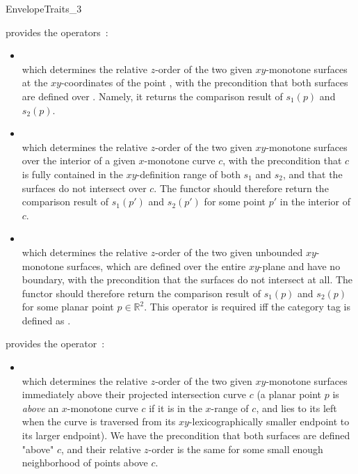 \begin{ccRefConcept}{EnvelopeTraits_3}
{provides the operators~:
 \begin{itemize}
 \item {}\\
 which determines the relative $z$-order of the two given $xy$-monotone
 surfaces at the $xy$-coordinates of the point , with the
 precondition that both surfaces are defined over . Namely, it
 returns the comparison result of $s_1(p)$ and $s_2(p)$.
%
 \item {}\\
 which determines the relative $z$-order of the two given $xy$-monotone
 surfaces over the interior of a given $x$-monotone curve $c$, with the
 precondition that $c$ is fully contained in the $xy$-definition range
 of both $s_1$ and $s_2$, and that the surfaces do not intersect over
 $c$. The functor should therefore return the comparison result of
 $s_1(p')$ and $s_2(p')$ for some point $p'$ in the interior of $c$.
 \item {}\\
 which determines the relative $z$-order of the two given unbounded
 $xy$-monotone surfaces, which are defined over the entire $xy$-plane and
 have no boundary, with the precondition that the surfaces do not intersect
 at all.
 The functor should therefore return the comparison result of
 $s_1(p)$ and $s_2(p)$ for some planar point $p \in \mathbb{R}^2$.
 This operator is required iff the category tag  
 is defined as .
 \end{itemize}}

{provides the operator~:
 \begin{itemize}
 \item {}\\
 which determines the relative $z$-order of the two given $xy$-monotone
 surfaces immediately above their projected intersection curve
 $c$ (a planar point $p$ is {\em above} an $x$-monotone curve $c$ if it
 is in the $x$-range of $c$, and lies to its left when the curve is
 traversed from its $xy$-lexicographically smaller endpoint to its
 larger endpoint). We have the precondition that both surfaces are
 defined "above" $c$, and their relative $z$-order is the same for
 some small enough neighborhood of points above $c$.
 \end{itemize}}


\end{ccRefConcept}
